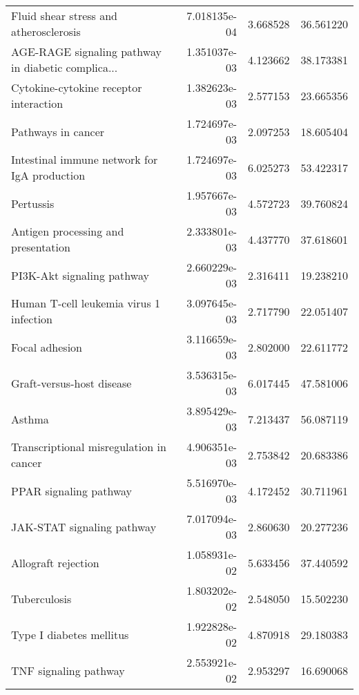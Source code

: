 \begin{tabular}{lrrr}
            Fluid shear stress and atherosclerosis &      7.018135e-04 &  3.668528 &       36.561220 \\
AGE-RAGE signaling pathway in diabetic complica... &      1.351037e-03 &  4.123662 &       38.173381 \\
            Cytokine-cytokine receptor interaction &      1.382623e-03 &  2.577153 &       23.665356 \\
                                Pathways in cancer &      1.724697e-03 &  2.097253 &       18.605404 \\
      Intestinal immune network for IgA production &      1.724697e-03 &  6.025273 &       53.422317 \\
                                         Pertussis &      1.957667e-03 &  4.572723 &       39.760824 \\
               Antigen processing and presentation &      2.333801e-03 &  4.437770 &       37.618601 \\
                        PI3K-Akt signaling pathway &      2.660229e-03 &  2.316411 &       19.238210 \\
           Human T-cell leukemia virus 1 infection &      3.097645e-03 &  2.717790 &       22.051407 \\
                                    Focal adhesion &      3.116659e-03 &  2.802000 &       22.611772 \\
                         Graft-versus-host disease &      3.536315e-03 &  6.017445 &       47.581006 \\
                                            Asthma &      3.895429e-03 &  7.213437 &       56.087119 \\
           Transcriptional misregulation in cancer &      4.906351e-03 &  2.753842 &       20.683386 \\
                            PPAR signaling pathway &      5.516970e-03 &  4.172452 &       30.711961 \\
                        JAK-STAT signaling pathway &      7.017094e-03 &  2.860630 &       20.277236 \\
                               Allograft rejection &      1.058931e-02 &  5.633456 &       37.440592 \\
                                      Tuberculosis &      1.803202e-02 &  2.548050 &       15.502230 \\
                          Type I diabetes mellitus &      1.922828e-02 &  4.870918 &       29.180383 \\
                             TNF signaling pathway &      2.553921e-02 &  2.953297 &       16.690068 \\

\end{tabular}
